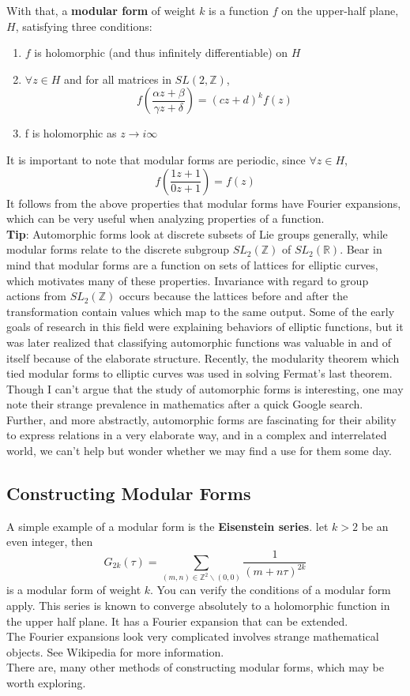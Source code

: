 \documentclass[11pt, oneside]{amsart}
\begin{document}
With that, a \textbf{modular form} of weight $k$ is a function $f$ on the upper-half plane, $H$, satisfying three conditions:

\begin{enumerate}
	\item $f$ is holomorphic (and thus infinitely differentiable) on $H$
	\item $\forall z \in H$ and for all matrices in $SL(2, \mathbb{Z})$,
	$$f\left( \frac{\alpha z + \beta}{\gamma z + \delta} \right) = (cz+d)^k f(z)$$
	\item f is holomorphic as $z\rightarrow i\infty$
\end{enumerate}
It is important to note that modular forms are periodic, since $\forall z \in H$,
	$$f\left( \frac{1 z + 1}{0 z + 1} \right) = f(z)$$
It follows from the above properties that modular forms have Fourier expansions, which can be very useful when analyzing properties of a function.\\
\textbf{Tip}: Automorphic forms look at discrete subsets of Lie groups generally, while modular forms relate to the discrete subgroup $SL_2(\mathbb{Z})$ of $SL_2(\mathbb{R})$.
Bear in mind that modular forms are a function on sets of lattices for elliptic curves, which motivates many of these properties. Invariance with regard to group actions from $SL_2(\mathbb{Z})$ occurs because the lattices before and after the transformation contain values which map to the same output.
Some of the early goals of research in this field were explaining behaviors of elliptic functions, but it was later realized that classifying automorphic functions was valuable in and of itself because of the elaborate structure. Recently, the modularity theorem which tied modular forms to elliptic curves was used in solving Fermat's last theorem.\\
Though I can't argue that the study of automorphic forms is interesting, one may note their strange prevalence in mathematics after a quick Google search. Further, and more abstractly, automorphic forms are fascinating for their ability to express relations in a very elaborate way, and in a complex and interrelated world, we can't help but wonder whether we may find a use for them some day.

\subsection{Constructing Modular Forms}
A simple example of a modular form is the \textbf{Eisenstein series}. let $k>2$ be an even integer, then $$G_{2 k}(\tau)=\sum_{(m, n) \in \mathbb{Z}^{2} \backslash(0,0)} \frac{1}{(m+n \tau)^{2 k}}$$ is a modular form of weight $k$. You can verify the conditions of a modular form apply. This series is known to converge absolutely to a holomorphic function in the upper half plane. It has a Fourier expansion that can be extended.\\
The Fourier expansions look very complicated involves strange mathematical objects. See Wikipedia for more information.\\
There are, many other methods of constructing modular forms, which may be worth exploring.
\end{document}
